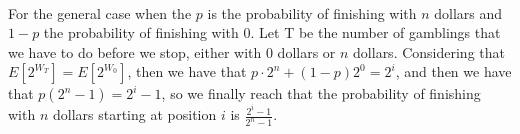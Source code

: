 \documentclass[tikz, 12pt]{scrartcl}
\begin{document}
\begin{enumerate}
\\
For the general case when the $p$ is the probability of finishing with $n$ dollars and $1- p$ the probability of finishing with 0. Let T be the number of gamblings that we have to do before we stop, either with 0 dollars or $n$ dollars. Considering that $E[2^{W_T}] = E[2^{W_0}]$, then we have that $p \cdot 2^n + (1 - p)2^0 = 2^i$, and then we have that $p(2^n -1) = 2^i - 1$, so we finally reach that the probability of finishing  with $n$ dollars starting at position $i$ is $\frac{2^i - 1}{2^n - 1}$.


\end{enumerate}
\end{document}
